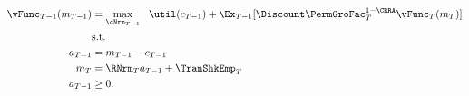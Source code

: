 \begin{equation*}\begin{gathered}\begin{aligned}
{\vFunc}_{T-1}({m}_{T-1})  & = \max_{\cNrm_{T-1}} ~~ \util({c}_{T-1}) + \Ex_{T-1} [\Discount \PermGroFac_{T}^{1-\CRRA}{\vFunc}_{T}({m}_{T})] \label{eq:ConstrArt}
\\ & \mbox{s.t.}  \nonumber
\\ {a}_{T-1}  & = {m}_{T-1} - {c}_{T-1}
\\ {m}_{T}  & = \RNrm_{T} {a}_{T-1} + \TranShkEmp_{T}
\\ {a}_{T-1} & \geq  0 .
\end{aligned}\end{gathered}\end{equation*}
